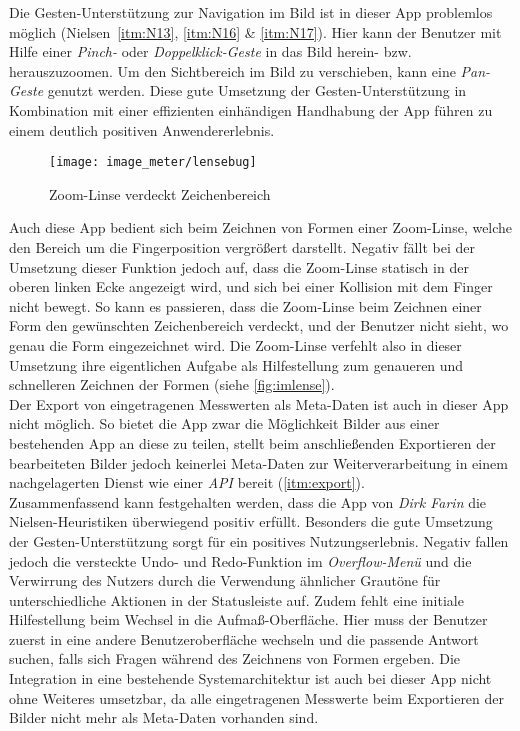 Die Gesten-Unterstützung zur Navigation im Bild ist in dieser App problemlos möglich (Nielsen~\autoref{itm:N13}, \autoref{itm:N16} \& \autoref{itm:N17}).
Hier kann der Benutzer mit Hilfe einer \emph{Pinch-} oder \emph{Doppelklick-Geste} in das Bild herein- bzw. herauszuzoomen.
Um den Sichtbereich im Bild zu verschieben, kann eine \emph{Pan-Geste} genutzt werden.
Diese gute Umsetzung der Gesten-Unterstützung in Kombination mit einer effizienten einhändigen Handhabung der App führen zu einem deutlich positiven Anwendererlebnis.

\begin{wrapfigure}{R}{0.5\textwidth}
  \centering
  \texttt{[image: image\_meter/lensebug]}
  \caption{Zoom-Linse verdeckt Zeichenbereich}
  \label{fig:imlense}
\end{wrapfigure}

Auch diese App bedient sich beim Zeichnen von Formen einer Zoom-Linse, welche den Bereich um die Fingerposition vergrößert darstellt.
Negativ fällt bei der Umsetzung dieser Funktion jedoch auf, dass die Zoom-Linse statisch in der oberen linken Ecke angezeigt wird, und sich bei einer Kollision mit dem Finger nicht bewegt.
So kann es passieren, dass die Zoom-Linse beim Zeichnen einer Form den gewünschten Zeichenbereich verdeckt, und der Benutzer nicht sieht, wo genau die Form eingezeichnet wird.
Die Zoom-Linse verfehlt also in dieser Umsetzung ihre eigentlichen Aufgabe als Hilfestellung zum genaueren und schnelleren Zeichnen der Formen (siehe \autoref{fig:imlense}). \\

Der Export von eingetragenen Messwerten als Meta-Daten ist auch in dieser App nicht möglich.
So bietet die App zwar die Möglichkeit Bilder aus einer bestehenden App an diese zu teilen, stellt beim anschließenden Exportieren der bearbeiteten Bilder jedoch keinerlei Meta-Daten zur Weiterverarbeitung in einem nachgelagerten Dienst wie einer \emph{API} bereit (\autoref{itm:export}). \\

Zusammenfassend kann festgehalten werden, dass die App \im{} von \emph{Dirk Farin} die Nielsen-Heuristiken überwiegend positiv erfüllt.
Besonders die gute Umsetzung der Gesten-Unterstützung sorgt für ein positives Nutzungserlebnis.
Negativ fallen jedoch die versteckte Undo- und Redo-Funktion im \emph{Overflow-Menü} und die Verwirrung des Nutzers durch die Verwendung ähnlicher Grautöne für unterschiedliche Aktionen in der Statusleiste auf.
Zudem fehlt eine initiale Hilfestellung beim Wechsel in die Aufmaß-Oberfläche.
Hier muss der Benutzer zuerst in eine andere Benutzeroberfläche wechseln und die passende Antwort suchen, falls sich Fragen während des Zeichnens von Formen ergeben.
Die Integration in eine bestehende Systemarchitektur ist auch bei dieser App nicht ohne Weiteres umsetzbar, da alle eingetragenen Messwerte beim Exportieren der Bilder nicht mehr als Meta-Daten vorhanden sind.
